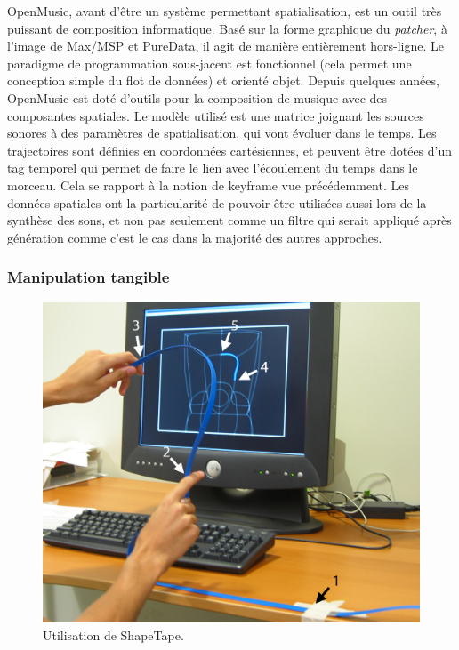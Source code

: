 \documentclass[french,12pt]{article}
\begin{document}
OpenMusic, avant d'être un système permettant spatialisation, est un outil très puissant de composition informatique. Basé sur la forme graphique du \textit{patcher}, à l'image de Max/MSP et PureData, il agit de manière entièrement hors-ligne. Le paradigme de programmation sous-jacent est fonctionnel (cela permet une conception simple du flot de données) et orienté objet.
Depuis quelques années, OpenMusic est doté d'outils pour la composition de musique avec des composantes spatiales\cite{bresson_spatial_2012}. Le modèle utilisé est une matrice joignant les sources sonores à des paramètres de spatialisation, qui vont évoluer dans le temps. 
Les trajectoires sont définies en coordonnées cartésiennes, et peuvent être dotées d'un tag temporel qui permet de faire le lien avec l'écoulement du temps dans le morceau. Cela se rapport à la notion de keyframe vue précédemment. Les données spatiales ont la particularité de pouvoir être utilisées aussi lors de la synthèse des sons, et non pas seulement comme un filtre qui serait appliqué après génération comme c'est le cas dans la majorité des autres approches.

\subsubsection{Manipulation tangible}

\begin{figure}[h]
    \centering
    \includegraphics[scale=0.20]{images/tape.png}
    \caption{Utilisation de ShapeTape.}
    \label{fig.shapetape}
\end{figure}
\end{document}
